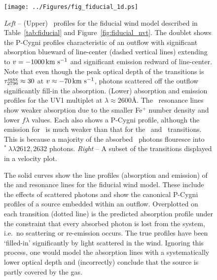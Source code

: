 \documentclass[12pt,preprint]{aastex}
\begin{document}
\begin{figure}
\texttt{[image: ../Figures/fig\_fiducial\_1d.ps]}
\caption{
{\it Left} -- (Upper) \mgiid\ profiles for the fiducial wind model
described in Table~\ref{tab:fiducial} and
Figure~\ref{fig:fiducial_nvt}.  The doublet shows the P-Cygni profiles
characteristic of an outflow with significant absorption blueward of
line-center (dashed vertical lines) extending to $v = -1000\, {\rm km~s^{-1}}$
and significant emission redward of line-center.  Note
that even though the peak optical depth of the  transitions
is $\tau_{2796}^{\rm max} \approx 30$ at $v \approx -70 \, {\rm km~s^{-1}}$,
photons scattered off the outflow significantly fill-in the absorption.
(Lower)  absorption and emission profiles for the UV1
multiplet at $\lambda \approx 2600$\AA.  The \feiid\ resonance lines 
show weaker absorption due to the smaller Fe$^+$ number density and
lower $f\lambda$ values.  Each also shows a P-Cygni profile, although
the emission for \feiia\ is much weaker than that for the
\feiib\ and \mgiid\ transitions.  This is because a majority of the
absorbed \feiia\ photons flouresce into
$^*~\lambda\lambda 2612, 2632$ photons.
{\it Right} -- A subset of the transitions displayed in a velocity
plot.
}
\label{fig:fiducial_1d}
\end{figure}

\begin{figure}
\caption{
The solid curves show the line profiles (absorption and emission) of
the  and  resonance lines for the fiducial wind
model.  These include the effects of scattered photons and show the
canonical P-Cygni profiles of a source 
embedded within an outflow.  Overplotted on each transition (dotted line) is
the predicted absorption profile under the constraint that every
absorbed photon is lost from the system, i.e.\ no scattering or
re-emission occurs.   The true profiles have been `filled-in' 
significantly by light scattered in the wind.  Ignoring this
process, one would model the absorption lines with a systematically lower
optical depth and (incorrectly) conclude that the source is partly covered by the
gas.  
}
\label{fig:noemiss}
\end{figure}
\end{document}
